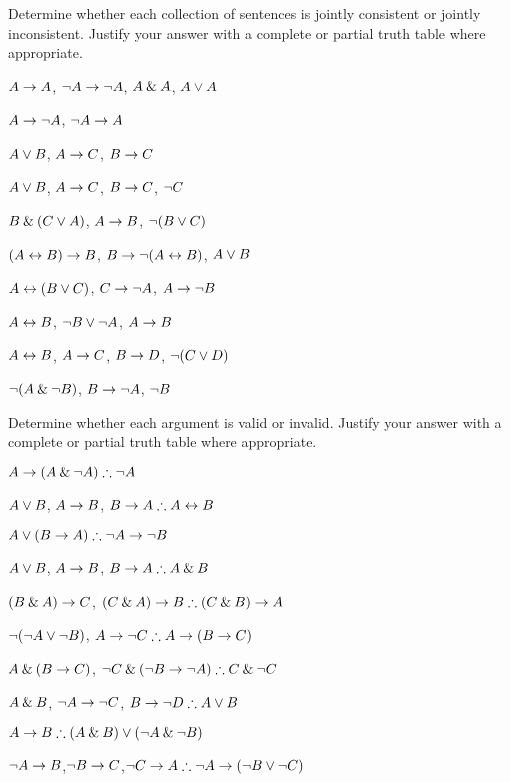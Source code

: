 \noindent\problempart
\label{pr.TT.consistent5}
Determine whether each collection of sentences is jointly consistent or jointly inconsistent. Justify your answer with a complete or partial truth table where appropriate.
\begin{earg}
\item $A\rightarrow A$, $\neg A \rightarrow \neg A$, $A\mathbin{\&} A$, $A\vee A$ %
\item $A \rightarrow \neg A$, $\neg A \rightarrow A$%
\item $A\vee B$, $A\rightarrow C$, $B\rightarrow C$ %
\item $A \vee B$, $A \rightarrow C$, $B \rightarrow C$, $\neg C$ %
\item $B\mathbin{\&}(C\vee A)$, $A\rightarrow B$, $\neg(B\vee C)$  %
\item $(A \leftrightarrow B) \rightarrow B$,  $B \rightarrow \neg (A \leftrightarrow B)$, $A \vee B$  %
\item $A\leftrightarrow(B\vee C)$, $C\rightarrow \neg A$, $A\rightarrow \neg B$ %
\item  $A \leftrightarrow B$,  $\neg B \vee \neg A$,  $A \rightarrow  B$ %
\item $A \leftrightarrow B$, $A \rightarrow C$, $B \rightarrow D$, $\neg(C \vee D)$ %
\item $\neg (A \mathbin{\&} \neg B)$,  $B \rightarrow \neg A$, $\neg B$   %
\end{earg}

\noindent\problempart Determine whether each argument is valid or invalid. Justify your answer with a complete or partial truth table where appropriate.
\label{pr.TT.valid5}
\begin{earg}
\item $A\eif(A\eand\enot A)\therefore \enot A$%
\item $A \vee B$, $A \rightarrow B$, $B \eif A \therefore  A \eiff B$  %
\item $A\eor(B\eif A)\therefore \enot A \eif \enot B$ %
\item $A \vee B$, $A \rightarrow B$, $ B \eif A \therefore  A \eand B$ %
\item $(B\mathbin{\&} A)\rightarrow C$, $(C\eand A)\eif B\therefore (C\eand B)\eif A$ %
\item $\neg (\neg A \vee \neg B)$, $A \eif \enot C \therefore  A \eif (B \eif C)$ %
\item $A \mathbin{\&} (B \rightarrow C)$, $\enot C \eand (\enot B \eif \enot A)\therefore C \eand \enot C$ %
\item $A \mathbin{\&} B$, $\neg A \rightarrow \neg C$, $B \eif \enot D \therefore  A \eor B$ %
\item $A \eif B\therefore (A \eand B) \eor (\enot A \eand \enot B)$ %
\item $\neg A \rightarrow B$,$ \neg B \rightarrow C $,$ \enot C \eif A \therefore  \enot A \eif (\enot B \eor \enot C) $%

\end{earg}

